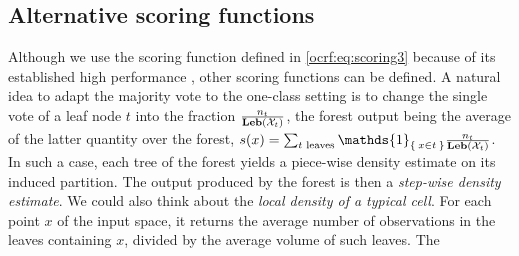 \subsection{Alternative scoring functions}
\label{supp:scoring_functions}
Although we use the scoring function defined in \cref{ocrf:eq:scoring3} because
of its established high performance \citep{Liu2008}, other scoring functions
can be defined.
A natural idea to adapt the majority vote to the one-class setting is to change
the single vote of a leaf node $t$ into the fraction
$\frac{n_t}{\mathbf{Leb}(\mathcal{X}_t)}$, the forest output being the average of the
latter quantity over the forest,
$s(x) = \sum_{t \text{~leaves}} \mathds{1}_{\Set{x \in t}}
\frac{n_t}{\Leb(\mathcal{X}_t)}$.
In such a case, each tree of the forest yields a piece-wise density estimate on
its induced partition.
The output produced by the forest is then a \emph{step-wise density estimate}.
%
We could also think about the \emph{local density of a typical cell}.  For each
point $x$ of the input space, it returns the average number of observations in
the leaves containing $x$, divided by the average volume of such leaves.  The
